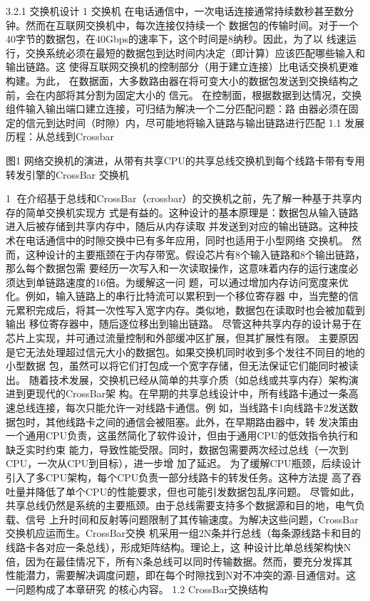 
3.2.1 交换机设计
1 交换机
在电话通信中，一次电话连接通常持续数秒甚至数分钟。然而在互联网交换机中，每次连接仅持续一个
数据包的传输时间。对于一个40字节的数据包，在40Gbps的速率下，这个时间是8纳秒。因此，为了以
线速运行，交换系统必须在最短的数据包到达时间内决定（即计算）应该匹配哪些输入和输出链路。这
使得互联网交换机的控制部分（用于建立连接）比电话交换机更难构建。为此，
在数据面，大多数路由器在将可变大小的数据包发送到交换结构之前，会在内部将其分割为固定大小的
信元。
在控制面，根据数据到达情况，交换组件输入输出端口建立连接，可归结为解决一个二分匹配问题：路
由器必须在固定的信元到达时间（时隙）内，尽可能地将输入链路与输出链路进行匹配
1.1 发展历程：从总线到Crossbar




图1 网络交换机的演进，从带有共享CPU的共享总线交换机到每个线路卡带有专用转发引擎的CrossBar
交换机

                                                      1
在介绍基于总线和CrossBar（crossbar）的交换机之前，先了解一种基于共享内存的简单交换机实现方
式是有益的。这种设计的基本原理是：数据包从输入链路进入后被存储到共享内存中，随后从内存读取
并发送到对应的输出链路。这种技术在电话通信中的时隙交换中已有多年应用，同时也适用于小型网络
交换机。
然而，这种设计的主要瓶颈在于内存带宽。假设芯片有8个输入链路和8个输出链路，那么每个数据包需
要经历一次写入和一次读取操作，这意味着内存的运行速度必须达到单链路速度的16倍。为缓解这一问
题，可以通过增加内存访问宽度来优化。例如，输入链路上的串行比特流可以累积到一个移位寄存器
中，当完整的信元累积完成后，将其一次性写入宽字内存。类似地，数据包在读取时也会被加载到输出
移位寄存器中，随后逐位移出到输出链路。
尽管这种共享内存的设计易于在芯片上实现，并可通过流量控制和外部缓冲区扩展，但其扩展性有限。
主要原因是它无法处理超过信元大小的数据包。如果交换机同时收到多个发往不同目的地的小型数据
包，虽然可以将它们打包成一个宽字存储，但无法保证它们能同时被读出。
随着技术发展，交换机已经从简单的共享介质（如总线或共享内存）架构演进到更现代的CrossBar架
构。在早期的共享总线设计中，所有线路卡通过一条高速总线连接，每次只能允许一对线路卡通信。例
如，当线路卡1向线路卡2发送数据包时，其他线路卡之间的通信会被阻塞。此外，在早期路由器中，转
发决策由一个通用CPU负责，这虽然简化了软件设计，但由于通用CPU的低效指令执行和缺乏实时约束
能力，导致性能受限。同时，数据包需要两次经过总线（一次到CPU，一次从CPU到目标），进一步增
加了延迟。
为了缓解CPU瓶颈，后续设计引入了多CPU架构，每个CPU负责一部分线路卡的转发任务。这种方法提
高了吞吐量并降低了单个CPU的性能要求，但也可能引发数据包乱序问题。
尽管如此，共享总线仍然是系统的主要瓶颈。由于总线需要支持多个数据源和目的地，电气负载、信号
上升时间和反射等问题限制了其传输速度。为解决这些问题，CrossBar交换机应运而生。CrossBar交换
机采用一组2N条并行总线（每条源线路卡和目的线路卡各对应一条总线），形成矩阵结构。理论上，这
种设计比单总线架构快N倍，因为在最佳情况下，所有N条总线可以同时传输数据。然而，要充分发挥其
性能潜力，需要解决调度问题，即在每个时隙找到N对不冲突的源-目通信对。这一问题构成了本章研究
的核心内容。
1.2 CrossBar交换结构




